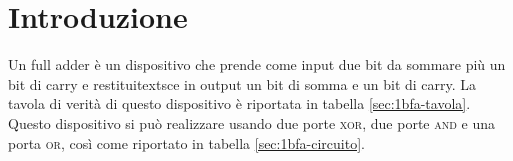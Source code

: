 \section{Introduzione}\label{sec:textscopo}
Un full adder è un dispositivo che prende come input due bit da sommare più un bit di carry e restituitextsce in output
un bit di somma e un bit di carry.
La tavola di verità di questo dispositivo è riportata in tabella \ref{sec:1bfa-tavola}.
Questo dispositivo si può realizzare usando due porte \textsc{xor}, due porte \textsc{and} e una porta \textsc{or}, così come
riportato in tabella \ref{sec:1bfa-circuito}.




